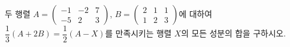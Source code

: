 두 행렬 $A=\begin{pmatrix} -1 & -2 & 7 \\ -5 & 2 & 3 \end{pmatrix}$, $B=\begin{pmatrix} 2 & 1 & 1 \\ 1 & 2 & 3 \end{pmatrix}$에 대하여 $\dfrac{1}{3}(A+2B)=\dfrac{1}{2}(A-X)$를 만족시키는 행렬 $X$의 모든 성분의 합을 구하시오.
